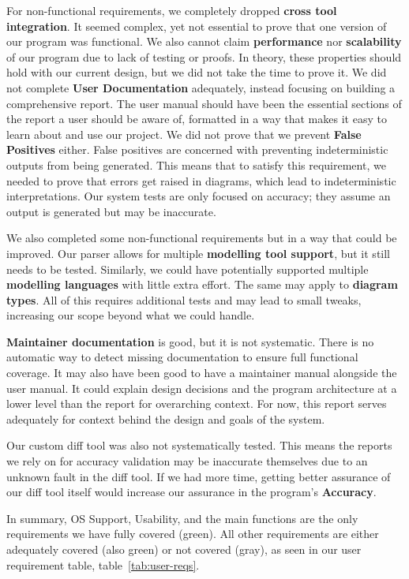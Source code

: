 For non-functional requirements, we completely dropped \textbf{cross tool integration}.
It seemed complex, yet not essential to prove that one version of our program was functional.
We also cannot claim \textbf{performance} nor \textbf{scalability} of our program due to lack of testing or proofs.
In theory, these properties should hold with our current design, but we did not take the time to prove it.
We did not complete \textbf{User Documentation} adequately, instead focusing on building a comprehensive report.
The user manual should have been the essential sections of the report a user should be aware of,
formatted in a way that makes it easy to learn about and use our project.
We did not prove that we prevent \textbf{False Positives} either.
False positives are concerned with preventing indeterministic outputs from being generated.
This means that to satisfy this requirement, we needed to prove that errors get raised in diagrams, which lead to indeterministic interpretations.
Our system tests are only focused on accuracy; they assume an output is generated but may be inaccurate.

We also completed some non-functional requirements but in a way that could be improved.
Our parser allows for multiple \textbf{modelling tool support}, but it still needs to be tested.
Similarly, we could have potentially supported multiple \textbf{modelling languages} with little extra effort.
The same may apply to \textbf{diagram types}.
All of this requires additional tests and may lead to small tweaks, increasing our scope beyond what we could handle.

\textbf{Maintainer documentation} is good, but it is not systematic.
There is no automatic way to detect missing documentation to ensure full functional coverage.
It may also have been good to have a maintainer manual alongside the user manual.
It could explain design decisions and the program architecture at a lower level than the report for overarching context.
For now, this report serves adequately for context behind the design and goals of the system.

Our custom diff tool was also not systematically tested.
This means the reports we rely on for accuracy validation may be inaccurate themselves due to an unknown fault in the diff tool.
If we had more time, getting better assurance of our diff tool itself would increase our assurance in the program's
\textbf{Accuracy}.

In summary, OS Support, Usability, and the main functions are the only requirements we have fully covered (green).
All other requirements are either adequately covered (also green) or not covered (gray),
as seen in our user requirement table, table~\ref{tab:user-reqs}.


